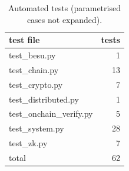 \begin{table}
\caption{Automated tests (parametrised cases not expanded).}
\label{tab:T21_test_inventory}
\begin{tabular}{lr}
\toprule
test file & tests \\
\midrule
test\_besu.py & 1 \\
test\_chain.py & 13 \\
test\_crypto.py & 7 \\
test\_distributed.py & 1 \\
test\_onchain\_verify.py & 5 \\
test\_system.py & 28 \\
test\_zk.py & 7 \\
total & 62 \\
\bottomrule
\end{tabular}
\end{table}
